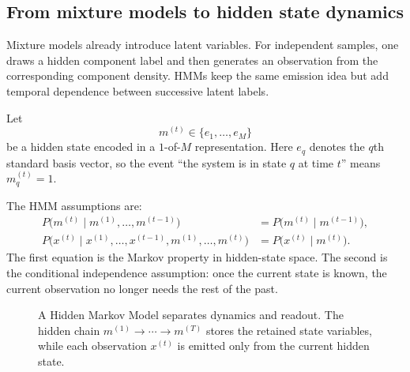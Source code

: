 \subsection{From mixture models to hidden state dynamics}

Mixture models already introduce latent variables. For independent samples, one draws a hidden component label and then generates an observation from the corresponding component density. HMMs keep the same emission idea but add temporal dependence between successive latent labels.

Let
\[
  m^{(t)} \in \{e_1,\dots,e_M\}
\]
be a hidden state encoded in a $1$-of-$M$ representation. Here $e_q$ denotes the $q$th standard basis vector, so the event ``the system is in state $q$ at time $t$'' means $m_q^{(t)}=1$.

The HMM assumptions are:
\begin{align*}
  P\bigl(m^{(t)}\mid m^{(1)},\dots,m^{(t-1)}\bigr)
  &=
  P\bigl(m^{(t)}\mid m^{(t-1)}\bigr),\\
  P\bigl(x^{(t)}\mid x^{(1)},\dots,x^{(t-1)},m^{(1)},\dots,m^{(t)}\bigr)
  &=
  P\bigl(x^{(t)}\mid m^{(t)}\bigr).
\end{align*}
The first equation is the Markov property in hidden-state space. The second is the conditional independence assumption: once the current state is known, the current observation no longer needs the rest of the past.

\begin{figure}[htbp]
  \centering
  \caption{A Hidden Markov Model separates dynamics and readout. The hidden chain $m^{(1)}\to\cdots\to m^{(T)}$ stores the retained state variables, while each observation $x^{(t)}$ is emitted only from the current hidden state.}
\end{figure}

